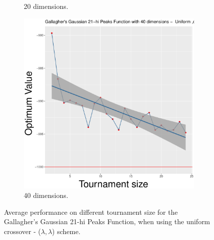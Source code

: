 \begin{figure}[t]
\begin{subfigure}[b]{0.33\textwidth}
		\caption{20 dimensions.}
	\end{subfigure}
	\begin{subfigure}[b]{0.33\textwidth}
		\centering
		\includegraphics[width=\textwidth]{img/uniform-40D/multimodal_uniform_22_dim_40.pdf}
		\caption{40 dimensions.}
	\end{subfigure}
	\caption{Average performance on different tournament size for the Gallagher's Gaussian 21-hi Peaks Function, when using the uniform crossover - ($\lambda, \lambda$) scheme.}
	\label{uniform-22}
\end{figure}

